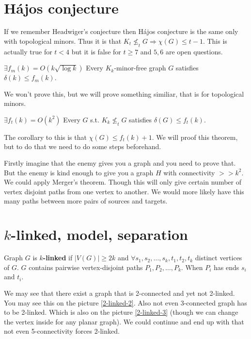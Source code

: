 \section{Hájos conjecture}

If we remember Headwiger's conjecture then Hájos conjecture is the same only with topological minors. Thus it is that $K_{t} \nleq_{t} G \Rightarrow \chi(G) \leq t-1$. This is actually true for $t < 4$ but it is false for $t \geq 7$ and $5,6$ are open questions.

\begin{thm}
	$\exists f_{m}(k) = O(k \sqrt{\log k})$ Every $K_{k}$-minor-free graph $G$ satisfies $\delta(k) \leq f_{m}(k)$.
\end{thm}

We won't prove this, but we will prove something similiar, that is for topological minors.

\begin{thm}
	$\exists f_{t}(k) = O(k^{2})$ Every $G$ s.t. $K_{k} \nleq_{t} G$ satisfies $\delta(G) \leq f_{t}(k)$.
\end{thm}

The corollary to this is that $\chi(G) \leq f_{t}(k) +1$. We will proof this theorem, but to do that we need to do some steps beforehand.

Firstly imagine that the enemy gives you a graph and you need to prove that. But the enemy is kind enough to give you a graph $H$ with connectivity $>> k^2$. We could apply Merger's theorem. Though this will only give certain number of vertex disjoint paths from one vertex to another. We would more likely have this many paths between more pairs of sources and targets.

\section{$k$-linked, model, separation}

\begin{defn}
	Graph $G$ is \textbf{$k$-linked} if $|V(G)| \geq 2k$ and $\forall s_{1}, s_{2}, \dots, s_{k}, t_{1}, t_{2}, t_{k}$ distinct vertices of $G$. $G$ contains pairwise vertex-disjoint paths $P_{1}, P_{2}, \dots, P_{k}$. When $P_{i}$ has ends $s_{i}$ and $t_{i}$.
\end{defn}

We may see that there exist a graph that is 2-connected and yet not 2-linked. You may see this on the picture \ref{2-linked-2}. Also not even 3-connected graph has to be 2-linked. Which is also on the picture \ref{2-linked-3} (though we can change the vertex inside for any planar graph). We could continue and end up with that not even 5-connectivity forces 2-linked.

